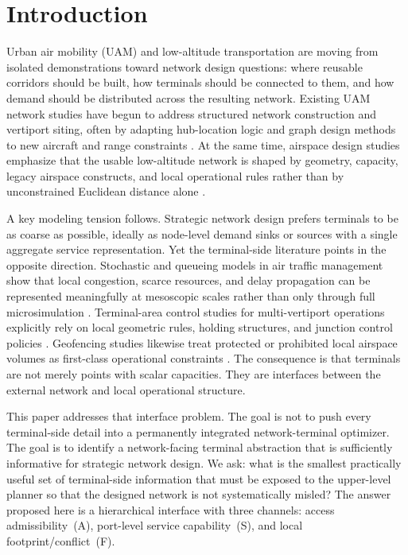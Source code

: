\documentclass[review,authoryear]{elsarticle}
\begin{document}
\section{Introduction}
\label{sec:introduction}

Urban air mobility (UAM) and low-altitude transportation are moving from isolated demonstrations toward network design questions: where reusable corridors should be built, how terminals should be connected to them, and how demand should be distributed across the resulting network. Existing UAM network studies have begun to address structured network construction and vertiport siting, often by adapting hub-location logic and graph design methods to new aircraft and range constraints \citep{Willey2021}. At the same time, airspace design studies emphasize that the usable low-altitude network is shaped by geometry, capacity, legacy airspace constructs, and local operational rules rather than by unconstrained Euclidean distance alone \citep{Bauranov2021,Vascik2020}.

A key modeling tension follows. Strategic network design prefers terminals to be as coarse as possible, ideally as node-level demand sinks or sources with a single aggregate service representation. Yet the terminal-side literature points in the opposite direction. Stochastic and queueing models in air traffic management show that local congestion, scarce resources, and delay propagation can be represented meaningfully at mesoscopic scales rather than only through full microsimulation \citep{Shone2021,Itoh2019}. Terminal-area control studies for multi-vertiport operations explicitly rely on local geometric rules, holding structures, and junction control policies \citep{Shao2021}. Geofencing studies likewise treat protected or prohibited local airspace volumes as first-class operational constraints \citep{Kim2022}. The consequence is that terminals are not merely points with scalar capacities. They are interfaces between the external network and local operational structure.

This paper addresses that interface problem. The goal is not to push every terminal-side detail into a permanently integrated network-terminal optimizer. The goal is to identify a network-facing terminal abstraction that is sufficiently informative for strategic network design. We ask: what is the smallest practically useful set of terminal-side information that must be exposed to the upper-level planner so that the designed network is not systematically misled? The answer proposed here is a hierarchical interface with three channels: access admissibility~(A), port-level service capability~(S), and local footprint/conflict~(F).
\end{document}
